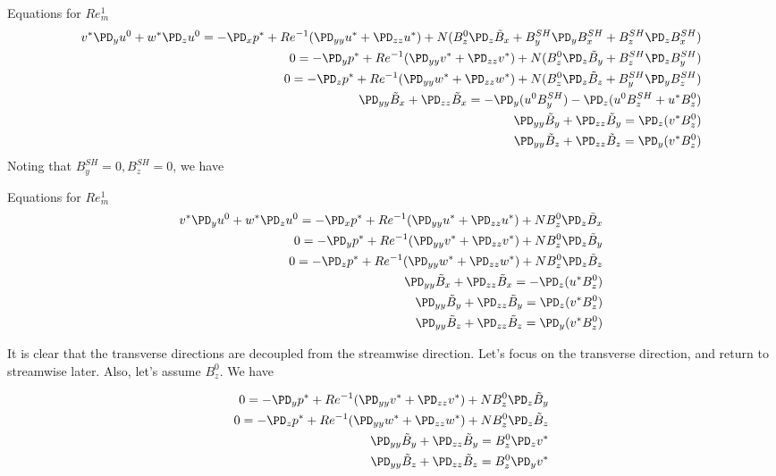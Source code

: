 \documentclass[11pt]{article}
\newcommand{\BS}{B^{SH}}
\newcommand{\BT}{\tilde{B}}
\begin{document}
Equations for $Re_m^1$
\begin{equation}\begin{aligned}
v^* \PD_y u^0 + w^* \PD_z u^0 = -\PD_x p^*+ Re^{-1} (\PD_{yy} u^* + \PD_{zz} u^*) + N ( B_z^0 \PD_z \BT_x + \BS_y \PD_y \BS_x + \BS_z \PD_z \BS_x ) \\
0 = -\PD_y p^*+ Re^{-1} (\PD_{yy} v^* + \PD_{zz} v^*) + N ( B_z^0 \PD_z \BT_y + \BS_z \PD_z \BS_y ) \\
0 = -\PD_z p^*+ Re^{-1} (\PD_{yy} w^* + \PD_{zz} w^*) + N ( B_z^0 \PD_z \BT_z + \BS_y \PD_y \BS_z) \\
\PD_{yy} \BT_x + \PD_{zz} \BT_x =-\PD_y ( u^0 \BS_y) - \PD_z ( u^0 \BS_z + u^* B_z^0) \\
\PD_{yy} \BT_y + \PD_{zz} \BT_y = \PD_z ( v^* B_z^0 ) \\
\PD_{yy} \BT_z + \PD_{zz} \BT_z = \PD_y ( v^* B_z^0 ) \\
\end{aligned}\end{equation}
Noting that $\BS_y = 0, \BS_z = 0$, we have

Equations for $Re_m^1$
\begin{equation}\begin{aligned}
v^* \PD_y u^0 + w^* \PD_z u^0 = -\PD_x p^*+ Re^{-1} (\PD_{yy} u^* + \PD_{zz} u^*) + N B_z^0 \PD_z \BT_x \\
0 = -\PD_y p^*+ Re^{-1} (\PD_{yy} v^* + \PD_{zz} v^*) + N B_z^0 \PD_z \BT_y \\
0 = -\PD_z p^*+ Re^{-1} (\PD_{yy} w^* + \PD_{zz} w^*) + N B_z^0 \PD_z \BT_z \\
\PD_{yy} \BT_x + \PD_{zz} \BT_x =-\PD_z ( u^* B_z^0 ) \\
\PD_{yy} \BT_y + \PD_{zz} \BT_y = \PD_z ( v^* B_z^0 ) \\
\PD_{yy} \BT_z + \PD_{zz} \BT_z = \PD_y ( v^* B_z^0 ) \\
\end{aligned}\end{equation}

It is clear that the transverse directions are decoupled from the streamwise direction.
Let's focus on the transverse direction, and return to streamwise later. Also, let's assume $B_z^0$. We have

\begin{equation}\begin{aligned}
0 = -\PD_y p^*+ Re^{-1} (\PD_{yy} v^* + \PD_{zz} v^*) + N B_z^0 \PD_z \BT_y \\
0 = -\PD_z p^*+ Re^{-1} (\PD_{yy} w^* + \PD_{zz} w^*) + N B_z^0 \PD_z \BT_z \\
\PD_{yy} \BT_y + \PD_{zz} \BT_y = B_z^0 \PD_z v^* \\
\PD_{yy} \BT_z + \PD_{zz} \BT_z = B_z^0 \PD_y v^* \\
\end{aligned}\end{equation}
\end{document}
